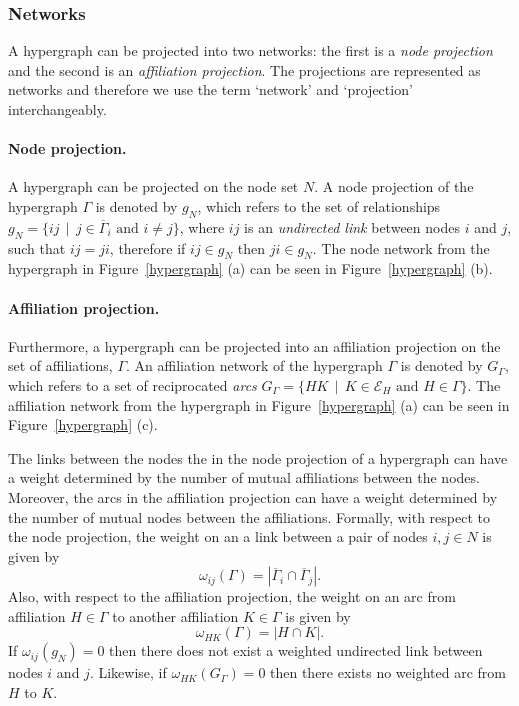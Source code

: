 \subsubsection*{Networks}

A hypergraph can be projected into two networks: the first is a \emph{node projection} and the second is an \emph{affiliation projection}. The projections are represented as networks and therefore we use the term `network' and `projection' interchangeably.

\paragraph{Node projection.}

A hypergraph can be projected on the node set $N$. A node projection of the hypergraph $\Gamma$ is denoted by $g_N$, which refers to the set of relationships $g_N = \{ij \, \mid \, j \in \overline{\Gamma}_{i} \mbox{ and } i \neq j \}$, where $ij$ is an \emph{undirected link} between nodes $i$ and $j$, such that $ij = ji$, therefore if $ij \in g_{N}$ then $ji \in g_{N}$. The node network from the hypergraph in Figure~\ref{hypergraph} (a) can be seen in Figure~\ref{hypergraph} (b).

\paragraph{Affiliation projection.}

Furthermore, a hypergraph can be projected into an affiliation projection on the set of affiliations, $\Gamma$. An affiliation network of the hypergraph $\Gamma$ is denoted by $G_{\Gamma}$, which refers to a set of reciprocated \emph{arcs} $G_{\Gamma} = \{ HK \, \mid \, K \in \mathcal{E}_{H} \mbox{ and } H \in \Gamma \}$. The affiliation network from the hypergraph in Figure~\ref{hypergraph} (a) can be seen in Figure~\ref{hypergraph} (c).

The links between the nodes the in the node projection of a hypergraph can have a weight determined by the number of mutual affiliations between the nodes. Moreover, the arcs in the affiliation projection can have a weight determined by the number of mutual nodes between the affiliations. Formally, with respect to the node projection, the weight on an a link between a pair of nodes $i,j \in N$ is given by
\begin{equation} \label{eq:nodeweight}
\omega_{ij}(\Gamma) = | \overline{\Gamma}_{i} \cap \overline{\Gamma}_{j} | .
\end{equation}
Also, with respect to the affiliation projection, the weight on an arc from affiliation $H \in \Gamma$ to another affiliation $K \in \Gamma$ is given by
\begin{equation} \label{eq:affweight}
\omega_{HK}(\Gamma) = | H \cap K | .
\end{equation}
If $\omega_{ij}(g_{N}) = 0$ then there does not exist a weighted undirected link between nodes $i$ and $j$. Likewise, if $\omega_{HK}(G_{\Gamma}) = 0$ then there exists no weighted arc from $H$ to $K$.

